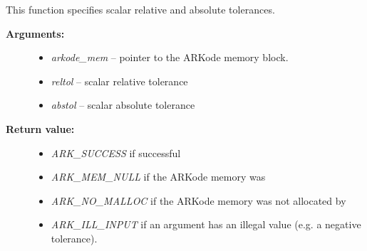 \documentclass[letterpaper,10pt,english]{sphinxmanual}
\begin{document}
\begin{fulllineitems}
\label{c_interface/User_callable:ARKodeSStolerances}
This function specifies scalar relative and absolute tolerances.
\begin{description}
\item[{\textbf{Arguments:}}] \leavevmode\begin{itemize}
\item {} 
\emph{arkode\_mem} -- pointer to the ARKode memory block.

\item {} 
\emph{reltol} -- scalar relative tolerance

\item {} 
\emph{abstol} -- scalar absolute tolerance

\end{itemize}

\item[{\textbf{Return value:}}] \leavevmode\begin{itemize}
\item {} 
\emph{ARK\_SUCCESS} if successful

\item {} 
\emph{ARK\_MEM\_NULL}  if the ARKode memory was 

\item {} 
\emph{ARK\_NO\_MALLOC}  if the ARKode memory was not allocated by {\hyperref[c_interface/User_callable:ARKodeInit]{}}

\item {} 
\emph{ARK\_ILL\_INPUT} if an argument has an illegal value (e.g. a negative tolerance).

\end{itemize}

\end{description}

\end{fulllineitems}

\end{document}
